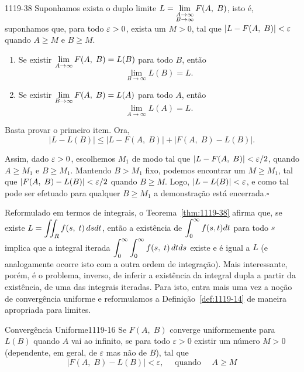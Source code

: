 \begin{theoc}{}{1119-38}
Suponhamos exista o duplo limite $\displaystyle{L =
\lim_{\substack{A\to\infty\\ B\to\infty}}F(A,\; B)}$, isto é,
suponhamos que, para todo $\varepsilon > 0$, exista um $M>0$, tal que
$|L-F(A,\; B)| <\varepsilon$ quando $A\geq M$ e $B\geq M$.
\begin{enumerate}[label=(\arabic*)]
\item Se existir $\displaystyle{\lim_{A\to\infty}F(A,\;  B)= L(B)}$ para todo $B$, então
\begin{equation*}
  \lim_{B\to\infty} L(B)= L.
\end{equation*}
\item  Se existir $\displaystyle{\lim_{B\to\infty}F(A,\; B)= L(A)}$ para todo $A$, então
\begin{equation*}
  \lim_{A\to\infty} L(A)= L.
\end{equation*}
\end{enumerate}
\end{theoc}

\prova Basta provar o primeiro item. Ora,
\begin{equation}\label{1119-22}
|L - L(B)| \leq |L - F(A,\; B)| + |F(A,\; B) - L(B)|.
\end{equation}

Assim, dado $\varepsilon >0$, escolhemos $M_1$ de modo tal que $|L - F(A,\; B)| < \varepsilon/2$, quando 
$A \geq M_1$ e $B \geq M_1$. Mantendo $B > M_1$ fixo, podemos encontrar um $M\geq M_1$, tal que 
$|F(A,\; B) - L(B)| < \varepsilon/2$ quando $B\geq M$. Logo, $|L - L(B)| < \varepsilon$, e
como tal pode ser efetuado para qualquer $B \geq M_1$ a
demonstração está encerrada.\hfill $\square$


Reformulado em termos de integrais, o Teorema~\ref{thm:1119-38} afirma
que, se existe  $\displaystyle{L =\iint_{R}f(s,\; t)\, dsdt}$,
então a existência de $\displaystyle{\int_0^\infty f(s,t) dt}$ para todo
$s$ implica que a integral iterada
$\displaystyle{\int_0^\infty\int_0^\infty f(s,\; t)\, dtds}$ existe e é igual a
$L$ (e analogamente ocorre isto com a outra ordem de integração).
Mais interessante, porém, é o problema, inverso, de inferir a
existência da integral dupla a partir da existência, de uma das
integrais iteradas. Para isto, entra mais uma vez a noção de
convergência uniforme e reformulamos a Definição~\ref{def:1119-14} de
maneira apropriada para limites.

\begin{defic}{Convergência Uniforme}{1119-16}
Se $F(A,\; B)$ converge uniformemente para
$L(B)$ quando $A$ vai ao infinito, se para todo $\varepsilon > 0$
existir um número $M> 0$ (dependente, em geral, de $\varepsilon$
mas não de $B$), tal que
\begin{equation*}
  |F(A,\;B)-L(B)| < \varepsilon,\quad \text{ quando }\quad A\geq M
\end{equation*}
\end{defic}

